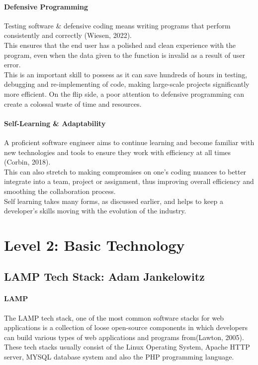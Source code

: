 \documentclass[a4paper, 11pt]{report}
\begin{document}
	\paragraph{Defensive Programming} Testing software \& defensive coding means writing programs that perform consistently and correctly (Wiesen, 2022).
	\\This ensures that the end user has a polished and clean experience with the program, even when the data given to the function is invalid as a result of user error.
	\\This is an important skill to possess as it can save hundreds of hours in testing, debugging and re-implementing of code, making large-scale projects significantly more efficient. On the flip side, a poor attention to defensive programming can create a colossal waste of time and resources.
	
	\paragraph{Self-Learning \& Adaptability} A proficient software engineer aims to continue learning and become familiar with new technologies and tools to ensure they work with efficiency at all times (Corbin, 2018). 
	\\This can also stretch to making compromises on one's coding nuances to better integrate into a team, project or assignment, thus improving overall efficiency and smoothing the collaboration process. 
	\\Self learning takes many forms, as discussed earlier, and helps to keep a developer's skills moving with the evolution of the industry. 
	
	
	\newpage
	\section{Level 2: Basic Technology}
	
	\subsection{LAMP Tech Stack: Adam Jankelowitz}
	\paragraph {LAMP} The LAMP tech stack, one of the most common software stacks for web applications is a collection of loose open-source components in which developers can build various types of web applications and programs from(Lawton, 2005). These tech stacks usually consist of the Linux Operating System, Apache HTTP server, MYSQL database system and also the PHP programming language.
	
\end{document}

